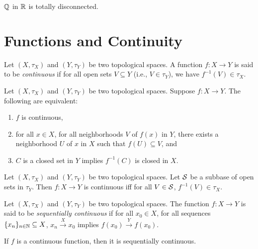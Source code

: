 \documentclass{techreport}
\begin{document}
\begin{example}\label{De:QInRIsTotallyDisconn}
	$\mathbb{Q}$ in $\mathbb{R}$ is totally disconnected.
\end{example}

\section{Functions and Continuity}

\begin{definition}\label{De:ContinuousFunctions}
	Let $(X,\tau_X)$ and $(Y,\tau_Y)$ be two topological spaces.
	A function $f : X \to Y$ is said to be \emph{continuous} if for all open sets $V \subseteq Y$ (i.e., $V \in \tau_Y$), we have $f^{-1}(V) \in \tau_X$.
\end{definition}

\begin{proposition}\label{Prop:SomeEquivResultsAboutContFunc}
	Let $(X,\tau_X)$ and $(Y,\tau_Y)$ be two topological spaces.
	Suppose $f : X \to Y$.
	The following are equivalent:
	\begin{enumerate}
		\item $f$ is continuous,
		\item for all $x \in X$, for all neighborhoods $V$ of $f(x)$ in $Y$, there exists a neighborhood $U$ of $x$ in $X$ such that $f(U) \subseteq V$, and
		\item $C$ is a closed set in $Y$ implies $f^{-1}(C)$ is closed in $X$.
	\end{enumerate}
\end{proposition}

\begin{proposition}\label{Prop:ContFuncIffOnSubbase}
	Let $(X,\tau_X)$ and $(Y,\tau_Y)$ be two topological spaces.
	Let $\mathcal{S}$ be a subbase of open sets in $\tau_Y$.
	Then $f : X \to Y$ is continuous iff for all $V \in \mathcal{S}$, $f^{-1}(V) \in \tau_X$.
\end{proposition}

\begin{definition}\label{De:SequentiallyContinuous}
	Let $(X,\tau_X)$ and $(Y,\tau_Y)$ be two topological spaces.
	The function $f : X \to Y$ is said to be \emph{sequentially continuous} if for all $x_0 \in X$, for all sequences $\{x_n\}_{n \in \mathbb{N}} \subseteq X$, $x_n \xrightarrow{X} x_0$ implies $f(x_0) \xrightarrow{Y} f(x_0)$.
\end{definition}

\begin{remark}\label{Rem:ContImplySeqCont}
	If $f$ is a continuous function, then it is sequentially continuous.
\end{remark}
\end{document}
